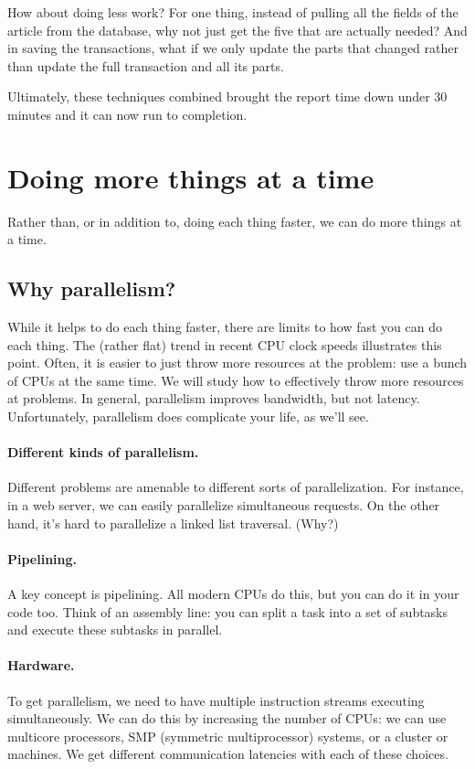 \documentclass[a4paper]{report}
\begin{document}
How about doing less work? For one thing, instead of pulling all the fields of the article from the database, why not just get the five that are actually needed? And in saving the transactions, what if we only update the parts that changed rather than update the full transaction and all its parts. 

Ultimately, these techniques combined brought the report time down under 30 minutes and it can now run to completion. 

\section*{Doing more things at a time} 
Rather than, or in addition to, doing each thing faster, we can do
more things at a time.

\subsection*{Why parallelism?}
While it helps to do each thing faster, there are limits to how fast
you can do each thing. The (rather flat) trend in recent CPU clock
speeds illustrates this point.  Often, it is easier to just throw more
resources at the problem: use a bunch of CPUs at the same time. We
will study how to effectively throw more resources at problems.
In general, parallelism improves bandwidth, but not latency.
Unfortunately, parallelism does complicate your life, as we'll see.

\paragraph{Different kinds of parallelism.} Different problems are amenable
to different sorts of parallelization. For instance, in a web server, we
can easily parallelize simultaneous requests. On the other hand, it's hard
to parallelize a linked list traversal. (Why?)

\paragraph{Pipelining.} A key concept is pipelining. All modern CPUs do this,
but you can do it in your code too. Think of an assembly line: you can split
a task into a set of subtasks and execute these subtasks in parallel.

\paragraph{Hardware.} To get parallelism, we need to have multiple instruction
streams executing simultaneously. We can do this by increasing the
number of CPUs: we can use multicore processors, SMP (symmetric
multiprocessor) systems, or a cluster or machines. We get different
communication latencies with each of these choices.
\end{document}
